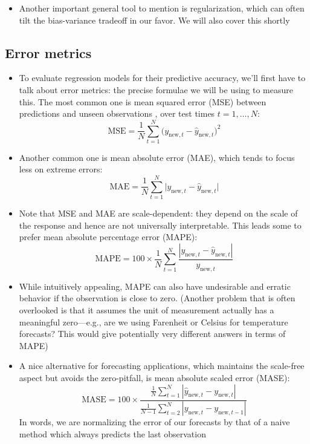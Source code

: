 \documentclass{article}
\begin{document}
\begin{itemize}
\item Another important general tool to mention is regularization, which can
  often tilt the bias-variance tradeoff in our favor. We will also cover this
  shortly 
\end{itemize}

\subsection{Error metrics}

\def\MSE{\mathrm{MSE}}
\def\MAE{\mathrm{MAE}}
\def\MAPE{\mathrm{MAPE}}
\def\MASE{\mathrm{MASE}}

\begin{itemize}
\item To evaluate regression models for their predictive accuracy, we'll first
  have to talk about error metrics: the precise formulae we will be using to 
  measure this. The most common one is mean squared error (MSE) between  
  predictions  and unseen observations
  , over test times $t = 1,\dots,N$:
  \[
  \MSE = \frac{1}{N} \sum_{t=1}^N \big( y_{\text{new},t} -
  \hat{y}_{\text{new},t} \big)^2
  \]

\item Another common one is mean absolute error (MAE), which tends to focus less
  on extreme errors: 
  \[
  \MAE = \frac{1}{N} \sum_{t=1}^N \big| y_{\text{new},t} -
  \hat{y}_{\text{new},t} \big|
  \]

\item Note that MSE and MAE are scale-dependent: they depend on the scale of the
  response and hence are not universally interpretable. This leads some to
  prefer mean absolute percentage error (MAPE):
  \[
  \MAPE = 100 \times \frac{1}{N} \sum_{t=1}^N \frac{| y_{\text{new},t} -
    \hat{y}_{\text{new},t}|}{ y_{\text{new},t} } 
  \]

\item While intuitively appealing, MAPE can also have undesirable and erratic
  behavior if the observation  is close to
  zero. (Another problem that is often overlooked is that it assumes the unit
  of measurement actually has a meaningful zero---e.g., are we using Farenheit 
  or Celsius for temperature forecasts? This would give potentially very
  different answers in terms of MAPE) 

\item A nice alternative for forecasting applications, which maintains the
  scale-free aspect but avoids the zero-pitfall, is mean absolute scaled error 
  (MASE):  
  \[
  \MASE = 100 \times \frac{\frac{1}{N} \sum_{t=1}^N | \hat{y}_{\text{new},t} -
    y_{\text{new},t} |}{\frac{1}{N-1} \sum_{t=2}^N | y_{\text{new},t} -
    y_{\text{new},t-1} |}  
  \]
  In words, we are normalizing the error of our forecasts by that of a naive
  method which always predicts the last observation


\end{itemize}
\end{document}
